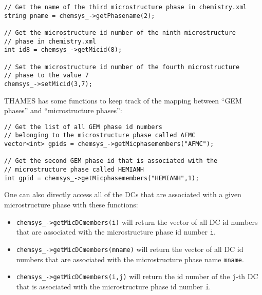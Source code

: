 \documentclass{article}
\begin{document}
\begin{lstlisting}
// Get the name of the third microstructure phase in chemistry.xml
string pname = chemsys_->getPhasename(2);

// Get the microstructure id number of the ninth microstructure
// phase in chemistry.xml
int id8 = chemsys_->getMicid(8);

// Set the microstructure id number of the fourth microstructure
// phase to the value 7
chemsys_->setMicid(3,7);
\end{lstlisting}

THAMES has some functions to keep track of the mapping between ``GEM phases''
and ``microstructure phases'':

\begin{lstlisting}
// Get the list of all GEM phase id numbers
// belonging to the microstructure phase called AFMC
vector<int> gpids = chemsys_->getMicphasemembers("AFMC");

// Get the second GEM phase id that is associated with the
// microstructure phase called HEMIANH
int gpid = chemsys_->getMicphasemembers("HEMIANH",1);
\end{lstlisting}

One can also directly access all of the DCs that are associated with a given
microstructure phase with these functions:
\begin{itemize}
    \item \verb!chemsys_->getMicDCmembers(i)! will return the vector of all
        DC id numbers that are associated with the microstructure phase id
        number \verb!i!.
    \item \verb!chemsys_->getMicDCmembers(mname)! will return the vector of all
        DC id numbers that are associated with the microstructure phase name
        \verb!mname!.
    \item \verb!chemsys_->getMicDCmembers(i,j)! will return the id number of the
        \verb!j!-th DC that is associated with the microstructure phase id number
        \verb!i!.
\end{itemize}
\end{document}
